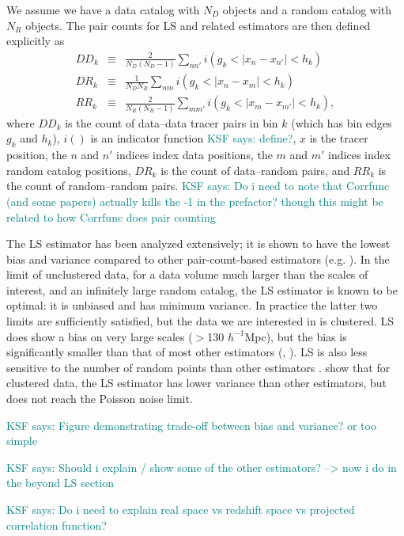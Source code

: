 \documentclass[modern]{aastex62}
\newcommand{\LS}{LS\xspace}
\newcommand{\hmpc}{$h^{-1}$Mpc}
\newcommand{\KSF}[1]{\textcolor{teal}{KSF says: #1}}
\begin{document}
We assume we have a data catalog with $N_D$ objects and a random catalog with $N_R$ objects.
The pair counts for \LS and related estimators are then defined explicitly as
\begin{eqnarray}\displaystyle
DD_k &\equiv& \frac{2}{N_D(N_D-1)} \sum_{n n'} i(g_k < |x_n - x_{n'}| < h_k) \\
DR_k &\equiv& \frac{1}{N_D N_R} \sum_{n m} i(g_k < |x_n - x_m| < h_k) \\
RR_k &\equiv& \frac{2}{N_R(N_R-1)} \sum_{m m'} i(g_k < |x_m - x_{m'}| < h_k),
\end{eqnarray}
where $DD_k$ is the count of data--data tracer pairs in bin $k$ (which has bin edges $g_k$ and $h_k$), $i()$ is an indicator function \KSF{define?}, $x$ is the tracer position, the $n$ and $n'$ indices index data positions, the $m$ and $m'$ indices index random catalog positions, $DR_k$ is the count of data--random pairs, and $RR_k$ is the count of random--random pairs.
\KSF{Do i need to note that Corrfunc (and some papers) actually kills the -1 in the prefactor? though this might be related to how Corrfunc does pair counting}

The \LS estimator has been analyzed extensively; it is shown to have the lowest bias and variance compared to other pair-count-based estimators (e.g. \citealt{Kerscher2000}).
In the limit of unclustered data, for a data volume much larger than the scales of interest, and an infinitely large random catalog, the \LS estimator is known to be optimal: it is unbiased and has minimum variance.
In practice the latter two limits are sufficiently satisfied, but the data we are interested in is clustered.
\LS does show a bias on very large scales ($>$130 \hmpc), but the bias is significantly smaller than that of most other estimators (\citealt{Kerscher1999}, \citealt{VargasMagana2013}).
\LS is also less sensitive to the number of random points than other estimators \citep{Kerscher2000}.
\cite{VargasMagana2013} show that for clustered data, the \LS estimator has lower variance than other estimators, but does not reach the Poisson noise limit.

\KSF{Figure demonstrating trade-off between bias and variance? or too simple}

\KSF{Should i explain / show some of the other estimators? --> now i do in the beyond LS section}

\KSF{Do i need to explain real space vs redshift space vs projected correlation function?}
\end{document}
